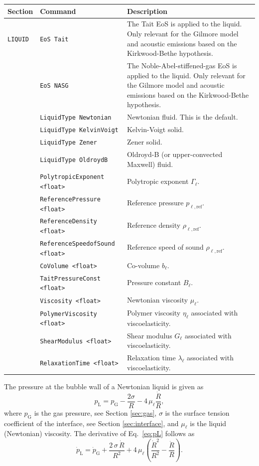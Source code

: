 \noindent
\begin{tabular}{p{} p{} p{}}
    \textbf{Section} &\textbf{Command} & \textbf{Description} 
\vspace{1mm} \\ \hline
{\tt LIQUID} & {\tt EoS Tait} & The Tait EoS is applied to the liquid. Only relevant for the Gilmore model and acoustic emissions based on the Kirkwood-Bethe hypothesis.\\ 
& {\tt EoS NASG} & The Noble-Abel-stiffened-gas EoS is applied to the liquid. Only relevant for the Gilmore model and acoustic emissions based on the Kirkwood-Bethe hypothesis.\\ 
& {\tt LiquidType Newtonian} & Newtonian fluid. This is the default.\\ 
& {\tt LiquidType KelvinVoigt} & Kelvin-Voigt solid.\\ 
& {\tt LiquidType Zener} & Zener solid.\\ 
& {\tt LiquidType OldroydB} & Oldroyd-B (or upper-convected Maxwell) fluid.\\ 
& {\tt PolytropicExponent <float>} & Polytropic exponent $\Gamma_{\ell}$.\\
& {\tt ReferencePressure <float>} & Reference pressure $p_{\ell,\text{ref}}$.\\
& {\tt ReferenceDensity <float>} & Reference density $\rho_{\ell,\text{ref}}$.\\
& {\tt ReferenceSpeedofSound <float>} & Reference speed of sound $\rho_{\ell,\text{ref}}$.\\
& {\tt CoVolume <float>} & Co-volume $b_\ell$.\\
& {\tt TaitPressureConst <float>} & Pressure constant $B_\ell$.\\
& {\tt Viscosity <float>} & Newtonian viscosity $\mu_\ell$.\\
& {\tt PolymerViscosity <float>} & Polymer viscosity $\eta_\ell$ associated with viscoelasticity.\\
& {\tt ShearModulus <float>} & Shear modulus $G_\ell$ associated with viscoelasticity.\\
& {\tt RelaxationTime <float>} & Relaxation time $\lambda_\ell$ associated with viscoelasticity.\\
 \hline
\end{tabular} \vspace{1em}

The pressure at the bubble wall of a Newtonian liquid is given as
\begin{equation}
  p_\text{L} = p_\text{G} - \frac{2 \sigma}{R} - 4 \, \mu_\ell \frac{\dot{R}}{R}, \label{eq:pL}
\end{equation}
where $p_\text{G}$ is the gas pressure, see Section \ref{sec:gas}, $\sigma$ is the surface tension coefficient of the interface, see Section \ref{sec:interface}, and $\mu_\ell$ is the liquid (Newtonian) viscosity. The derivative of Eq.~\eqref{eq:pL} follows as
\begin{equation}
  \dot{p}_\mathrm{L} = \dot{p}_\mathrm{G} + \frac{2 \, \sigma \, \dot{R}}{R^2} + 4 \, \mu_\ell \left(\frac{\dot{R}^2}{R^2} - \frac{\ddot{R}}{R}\right).
  \label{eq:dotpL}
\end{equation}

